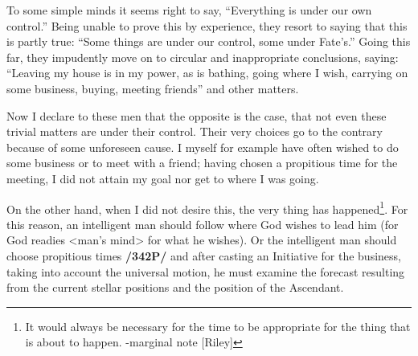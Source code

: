 To some simple minds it seems right to say, “Everything is under our own control.” Being unable to prove this by experience, they resort to saying that this is partly true: “Some things are under our control,
some under Fate’s.” Going this far, they impudently move on to circular and inappropriate conclusions, saying: “Leaving my house is in my power, as is bathing, going where I wish, carrying on some business,
buying, meeting friends” and other matters. 

Now I declare to these men that the opposite is the case, that not even these trivial matters are under their control. Their very choices go to the contrary because of some unforeseen cause. I myself for example have often wished to do some business or to meet with a friend; having chosen a propitious time for the meeting, I did not attain my goal nor get to where I was going.

On the other hand, when I did not desire this, the very thing has happened\footnote{It would always be necessary for the time to be appropriate for the thing that is about to happen. -marginal note [Riley]}. For this reason, an intelligent man should follow where God wishes to lead him (for God readies <man’s mind> for what he wishes). Or the intelligent man should choose propitious times \textbf{/342P/} and after casting an Initiative for the business, taking into account the universal motion, he must examine the forecast resulting from the current stellar positions and the position of the Ascendant.
 
\newpage